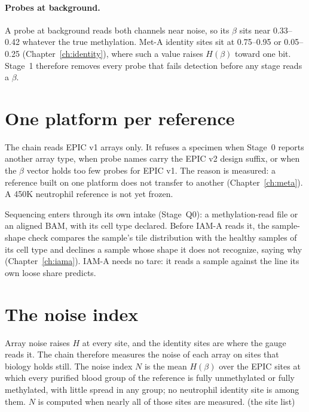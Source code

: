 \paragraph{Probes at background.} A probe at background reads both channels near noise, so its $\beta$ sits near 0.33--0.42 whatever the
true methylation. \measured{} Met-A identity sites sit at 0.75--0.95 or 0.05--0.25
(Chapter~\ref{ch:identity}), where such a value raises $H(\beta)$ toward one bit. Stage~1 therefore removes every probe that fails detection before any stage reads a $\beta$.

\section{One platform per reference}

The chain reads EPIC v1 arrays only. It refuses a specimen when Stage~0 reports another array type, when probe names carry the EPIC v2
design suffix, or when the $\beta$ vector holds too few probes for EPIC v1. The reason is
measured: a reference built on one platform does not transfer to another (Chapter~\ref{ch:meta}). A 450K neutrophil reference is not yet frozen. \openprob

Sequencing enters through its own intake (Stage~Q0): a methylation-read file or an aligned BAM, with its cell type declared. Before IAM-A reads it,
the sample-shape check compares the sample's tile distribution with the healthy samples of its cell type and declines a sample whose shape it does not
recognize, saying why (Chapter~\ref{ch:iama}). IAM-A needs no tare: it reads a sample against the line its own loose share predicts.

\section{The noise index}

Array noise raises $H$ at every site, and the identity sites are where the gauge reads it. The chain therefore measures the noise of each
array on sites that biology holds still. The noise index $N$ is the mean $H(\beta)$ over the EPIC sites at which every purified blood
group of the reference is fully unmethylated or fully methylated, with little spread in any group; no
neutrophil identity site is among them. $N$ is computed when nearly all of those sites are measured. \calibrated{} (the site list)


